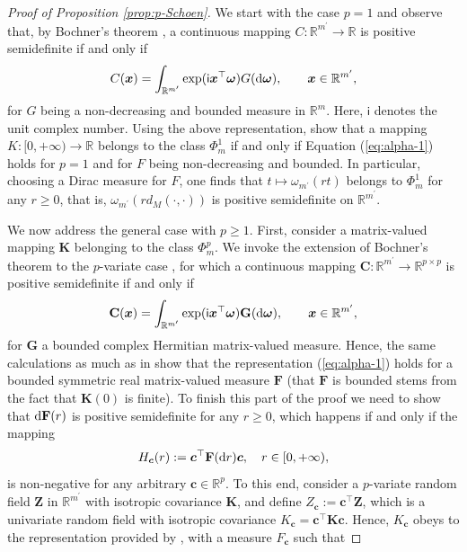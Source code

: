 \documentclass[12pt]{article}
\theoremstyle{plain}
\theoremstyle{remark}
\newcommand{\R}[0]{\mathbb{R}}
\newcommand{\dVec}[1]{{\bm{#1}}}            %
\newcommand{\latMatr}[1]{\mathbf{#1}}          %
\newcommand{\rVec}[1]{{\bm{#1}}}            %
\begin{document}
    
    \begin{proof}[Proof of Proposition \ref{prop:p-Schoen}] %
    We start with the case $p=1$ and observe that, by Bochner's theorem \citep{bochner1955harmonic}, a continuous mapping $C: \R^{{m^\prime}} \to \R$ is positive semidefinite if and only if 
    $$ C(\dVec{x}) = \int_{\R^{{m^\prime}}} \exp(\mathsf{i} \dVec{x}^{\top} \dVec{\omega}) G({\rm d}\dVec{\omega}), \qquad \dVec{x} \in \R^{{m^\prime}}, $$
    for $G$ being a non-decreasing and bounded measure in $\R^m$. Here, $\mathsf{i}$ denotes the unit complex number. Using the above representation, \cite{cambanis1983symmetric} show that a mapping $K: [0,+\infty) \to \R$ belongs to the class $\Phi_m^1$ if and only if Equation (\ref{eq:alpha-1}) holds for $p=
    1$ and for $F$ being non-decreasing and bounded. {In particular, choosing a Dirac measure for $F$, one finds that $t \mapsto \omega_{m^\prime}(rt)$ belongs to $\Phi_m^1$ for any $r \geq 0$, that is, $\omega_{m^\prime}(r d_M(\cdot,\cdot))$ is positive semidefinite on $\R^{m^\prime}$.}\par
    We now address the general case with $p \geq 1$. First, consider a matrix-valued mapping $\latMatr{K}$ belonging to the class $\Phi_m^p$. We invoke the extension of Bochner's theorem to the $p$-variate case \citep{cramer1940theory}, for which a continuous mapping $\latMatr{C}: \R^{{m^\prime}} \to \R^{p \times p}$ is positive semidefinite if and only if 
    $$ \latMatr{C}(\dVec{x}) = \int_{\R^{{m^\prime}}} \exp(\mathsf{i} \dVec{x}^{\top} \dVec{\omega})  \latMatr{G}({\rm d}\dVec{\omega}), \qquad \dVec{x} \in \R^{{m^\prime}}, $$
    for $\latMatr{G}$ a bounded {complex Hermitian} matrix-valued measure. Hence, the same calculations as much as in \cite{cambanis1983symmetric} show that the representation (\ref{eq:alpha-1}) holds for a bounded {symmetric} real matrix-valued measure $\latMatr{F}$ {(that $\latMatr{F}$ is bounded stems from the fact that $\latMatr{K}(0)$ is finite)}. To finish this part of the proof we need to show that ${\rm d}\latMatr{F}(r)$ is positive semidefinite for any $r \geq 0$, which happens if and only if the mapping
    $$ H_{{\dVec{c}}}(r) := \dVec{c}^\top {\latMatr{F}}({\rm d}r) \dVec{c}, \quad r \in [0,+\infty),$$
    is non-negative for any arbitrary $\dVec{c} \in \R^p$. 
    To this end, consider a $p$-variate random field $\rVec{Z}$ in $\R^{{m^\prime}}$ with isotropic covariance $\latMatr{K}$, and define $Z_{\dVec{c}} := \dVec{c}^\top \dVec{Z}$, which is a univariate random field with isotropic covariance $K_{\dVec{c}} = \dVec{c}^\top \latMatr{K} \dVec{c}$. Hence, $K_{\dVec{c}}$ obeys to the representation provided by \cite{cambanis1983symmetric}, with a measure $F_{\dVec{c}}$ such that 

\end{proof}
\end{document}
